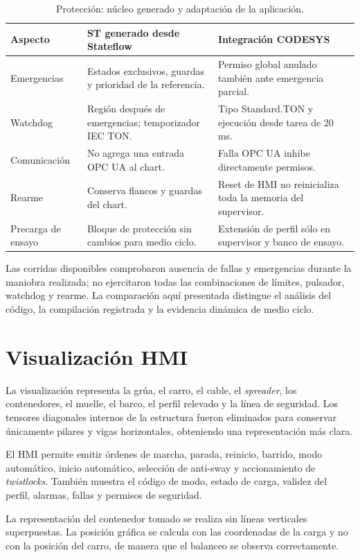 \documentclass[a4paper,10pt,onecolumn,journal]{ieeeconf}
\numberwithin{equation}{section}
\begin{document}
\begin{table}[!htbp]
\centering\footnotesize
\caption{Protección: núcleo generado y adaptación de la aplicación.}\label{tab:seguridad_auto_capas}
\begin{tabular}{L{3.6cm} L{5.5cm} L{5.5cm}}
\toprule
Aspecto & ST generado desde Stateflow & Integración CODESYS\\
\midrule
Emergencias & Estados exclusivos, guardas y prioridad de la referencia. & Permiso global anulado también ante emergencia parcial.\\
Watchdog & Región después de emergencias; temporizador IEC TON. & Tipo Standard.TON y ejecución desde tarea de 20 ms.\\
Comunicación & No agrega una entrada OPC UA al chart. & Falla OPC UA inhibe directamente permisos.\\
Rearme & Conserva flancos y guardas del chart. & Reset de HMI no reinicializa toda la memoria del supervisor.\\
Precarga de ensayo & Bloque de protección sin cambios para medio ciclo. & Extensión de perfil sólo en supervisor y banco de ensayo.\\
\bottomrule
\end{tabular}
\end{table}

Las corridas disponibles comprobaron ausencia de fallas y emergencias durante la maniobra realizada; no ejercitaron todas las combinaciones de límites, pulsador, watchdog y rearme. La comparación aquí presentada distingue el análisis del código, la compilación registrada y la evidencia dinámica de medio ciclo.


\section{Visualización HMI}
La visualización representa la grúa, el carro, el cable, el \textit{spreader}, los contenedores, el muelle, el barco, el perfil relevado y la línea de seguridad. Los tensores diagonales internos de la estructura fueron eliminados para conservar únicamente pilares y vigas horizontales, obteniendo una representación más clara.

El HMI permite emitir órdenes de marcha, parada, reinicio, barrido, modo automático, inicio automático, selección de anti-sway y accionamiento de \textit{twistlocks}. También muestra el código de modo, estado de carga, validez del perfil, alarmas, fallas y permisos de seguridad.

La representación del contenedor tomado se realiza sin líneas verticales superpuestas. La posición gráfica se calcula con las coordenadas de la carga y no con la posición del carro, de manera que el balanceo se observa correctamente.
\end{document}

